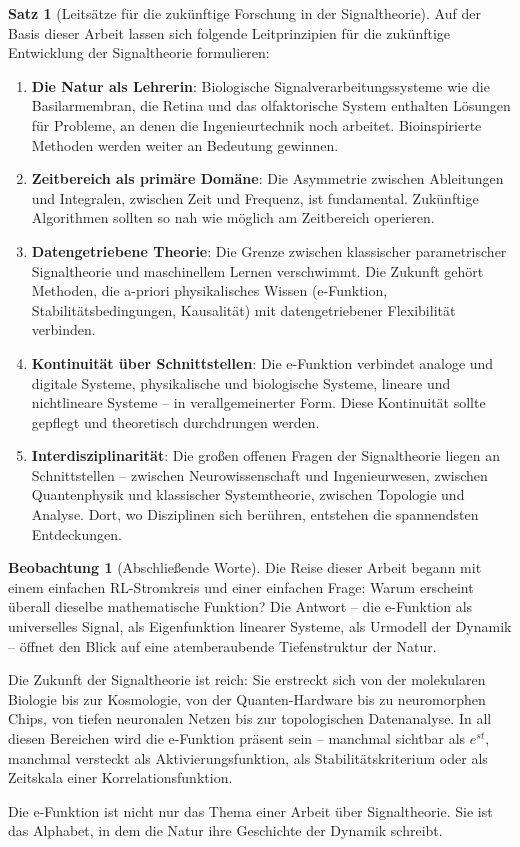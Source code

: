 ﻿\documentclass[a4paper,12pt]{report}
\theoremstyle{definition}
\newtheorem{satz}{Satz}
\newtheorem{beobachtung}{Beobachtung}
\begin{document}
	\begin{satz}[Leitsätze für die zukünftige Forschung in der Signaltheorie]
		Auf der Basis dieser Arbeit lassen sich folgende Leitprinzipien für die zukünftige Entwicklung der Signaltheorie formulieren:
		\begin{enumerate}
			\item[-] \textbf{Die Natur als Lehrerin}: Biologische Signalverarbeitungssysteme wie die Basilarmembran, die Retina und das olfaktorische System enthalten Lösungen für Probleme, an denen die Ingenieurtechnik noch arbeitet. Bioinspirierte Methoden werden weiter an Bedeutung gewinnen.
			\item[-] \textbf{Zeitbereich als primäre Domäne}: Die Asymmetrie zwischen Ableitungen und Integralen, zwischen Zeit und Frequenz, ist fundamental. Zukünftige Algorithmen sollten so nah wie möglich am Zeitbereich operieren.
			\item[-] \textbf{Dateng\-etriebene Theorie}: Die Grenze zwischen klassischer parametrischer Signaltheorie und maschinellem Lernen verschwimmt. Die Zukunft gehört Methoden, die a-priori physikalisches Wissen (e-Funktion, Stabilitätsbedingungen, Kausalität) mit datengetriebener Flexibilität verbinden.
			\item[-] \textbf{Kontinuität über Schnittstellen}: Die e-Funktion verbindet analoge und digitale Systeme, physikalische und biologische Systeme, lineare und nichtlineare Systeme -- in verallgemeinerter Form. Diese Kontinuität sollte gepflegt und theoretisch durchdrungen werden.
			\item[-] \textbf{Interdisziplinarität}: Die großen offenen Fragen der Signaltheorie liegen an Schnittstellen -- zwischen Neurowissenschaft und Ingenieurwesen, zwischen Quantenphysik und klassischer Systemtheorie, zwischen Topologie und Analyse. Dort, wo Disziplinen sich berühren, entstehen die spannendsten Entdeckungen.
		\end{enumerate}
	\end{satz}
	
	\begin{beobachtung}[Abschließende Worte]
		Die Reise dieser Arbeit begann mit einem einfachen RL-Stromkreis und einer einfachen Frage: Warum erscheint überall dieselbe mathematische Funktion? Die Antwort -- die e-Funktion als universelles Signal, als Eigenfunktion linearer Systeme, als Urmodell der Dynamik -- öffnet den Blick auf eine atemberaubende Tiefenstruktur der Natur.
		
		Die Zukunft der Signaltheorie ist reich: Sie erstreckt sich von der molekularen Biologie bis zur Kosmologie, von der Quanten-Hardware bis zu neuromorphen Chips, von tiefen neuronalen Netzen bis zur topologischen Datenanalyse. In all diesen Bereichen wird die e-Funktion präsent sein -- manchmal sichtbar als $e^{st}$, manchmal versteckt als Aktivierungsfunktion, als Stabilitäts\-kriterium oder als Zeitskala einer Korrelationsfunktion.
		
		Die e-Funktion ist nicht nur das Thema einer Arbeit über Signaltheorie. Sie ist das Alphabet, in dem die Natur ihre Geschichte der Dynamik schreibt.
	\end{beobachtung}
\end{document}
